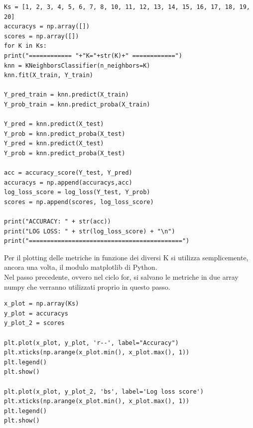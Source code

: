 \begin{lstlisting}
Ks = [1, 2, 3, 4, 5, 6, 7, 8, 10, 11, 12, 13, 14, 15, 16, 17, 18, 19, 20]
accuracys = np.array([])
scores = np.array([])
for K in Ks:
print("============ "+"K="+str(K)+" ============")
knn = KNeighborsClassifier(n_neighbors=K)
knn.fit(X_train, Y_train)

Y_pred_train = knn.predict(X_train)
Y_prob_train = knn.predict_proba(X_train)

Y_pred = knn.predict(X_test)
Y_prob = knn.predict_proba(X_test)
Y_pred = knn.predict(X_test)
Y_prob = knn.predict_proba(X_test)

acc = accuracy_score(Y_test, Y_pred)
accuracys = np.append(accuracys,acc)
log_loss_score = log_loss(Y_test, Y_prob)
scores = np.append(scores, log_loss_score)

print("ACCURACY: " + str(acc))
print("LOG LOSS: " + str(log_loss_score) + "\n")
print("===========================================")
\end{lstlisting}
Per il plotting delle metriche in funzione dei diversi K si utilizza semplicemente, ancora una volta, il modulo matplotlib di Python.\\
Nel passo precedente, ovvero nel ciclo for, si salvano le metriche in due array numpy che verranno utilizzati proprio in questo passo.
\begin{lstlisting}
x_plot = np.array(Ks)
y_plot = accuracys
y_plot_2 = scores

plt.plot(x_plot, y_plot, 'r--', label="Accuracy")
plt.xticks(np.arange(x_plot.min(), x_plot.max(), 1))
plt.legend()
plt.show()

plt.plot(x_plot, y_plot_2, 'bs', label='Log loss score')
plt.xticks(np.arange(x_plot.min(), x_plot.max(), 1))
plt.legend()
plt.show()
\end{lstlisting}
